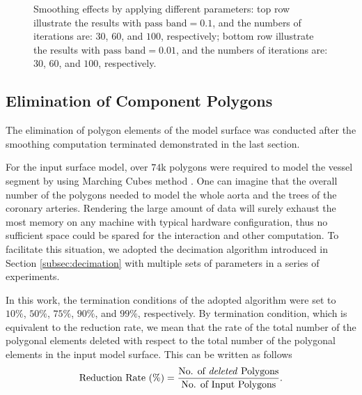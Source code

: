 \begin{figure}[t]
{\label{fig:Smooth60-01}}
\hfil
{}
\caption{Smoothing effects by applying different parameters: top row illustrate the results with $\text{pass band} = 0.1$, and the numbers of iterations are: $30$, $60$, and $100$, respectively; bottom row illustrate the results with $\text{pass band} = 0.01$, and the numbers of iterations are: $30$, $60$, and $100$, respectively.}%
\label{fig:Smooth}
\end{figure}

\subsection{Elimination of Component Polygons}

The elimination of polygon elements of the model surface was conducted after the smoothing computation terminated demonstrated in the last section.

For the input surface model, over $74$k polygons were required to model the vessel segment by using Marching Cubes method \cite{Lorensen1987MC}.
One can imagine that the overall number of the polygons needed to model the whole aorta and the trees of the coronary arteries.
Rendering the large amount of data will surely exhaust the most memory on any machine with typical hardware configuration, thus no sufficient space could be spared for the interaction and other computation.
To facilitate this situation, we adopted the decimation algorithm introduced in Section \ref{subsec:decimation} with multiple sets of parameters in a series of experiments. %

In this work, the termination conditions of the adopted algorithm were set to $10\%$, $50\%$, $75\%$, $90\%$, and $99\%$, respectively.
By termination condition, which is equivalent to the reduction rate, we mean that the rate of the total number of the polygonal elements deleted with respect to the total number of the polygonal elements in the input model surface. %
This can be written as follows
\begin{equation}
\label{eqn:ReductionRate}
\text{Reduction Rate (\%)} = \frac{\text{No. of \emph{deleted} Polygons}}{\text{No. of Input Polygons}}.
\end{equation}

